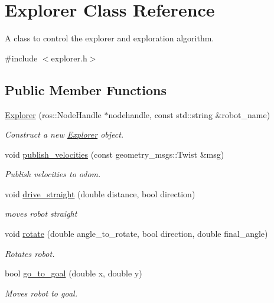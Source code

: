 \hypertarget{class_explorer}{}\section{Explorer Class Reference}
\label{class_explorer}


A class to control the explorer and exploration algorithm.  




{\ttfamily \#include $<$explorer.\+h$>$}

\subsection*{Public Member Functions}
\begin{DoxyCompactItemize}
\item 
\hyperlink{class_explorer_aafe6b7c3b9c2e24815aa14a731f31890}{Explorer} (ros\+::\+Node\+Handle $\ast$nodehandle, const std\+::string \&robot\+\_\+name)
\begin{DoxyCompactList}\small\item\em Construct a new \hyperlink{class_explorer}{Explorer} object. \end{DoxyCompactList}\item 
void \hyperlink{class_explorer_a8ffef25585ef957b9df4407366723787}{publish\+\_\+velocities} (const geometry\+\_\+msgs\+::\+Twist \&msg)
\begin{DoxyCompactList}\small\item\em Publish velocities to odom. \end{DoxyCompactList}\item 
void \hyperlink{class_explorer_ab4ca9f16c48a60fc4d0e426b6fd9e9a0}{drive\+\_\+straight} (double distance, bool direction)
\begin{DoxyCompactList}\small\item\em moves robot straight \end{DoxyCompactList}\item 
void \hyperlink{class_explorer_ac8e3a980fd3929734fb3a4b0b2e0a7e0}{rotate} (double angle\+\_\+to\+\_\+rotate, bool direction, double final\+\_\+angle)
\begin{DoxyCompactList}\small\item\em Rotates robot. \end{DoxyCompactList}\item 
bool \hyperlink{class_explorer_aa1e259feaac1114adb0f24588428e8ef}{go\+\_\+to\+\_\+goal} (double x, double y)
\begin{DoxyCompactList}\small\item\em Moves robot to goal. \end{DoxyCompactList}\item 

\end{DoxyCompactItemize}
